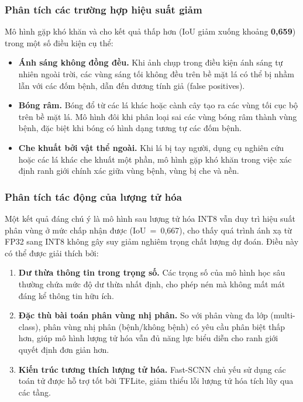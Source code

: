 \documentclass[conference]{IEEEtran}
\begin{document}
\subsubsection{Phân tích các trường hợp hiệu suất giảm}

Mô hình gặp khó khăn và cho kết quả thấp hơn (IoU giảm xuống khoảng \textbf{0,659}) trong một số điều kiện cụ thể:

\begin{itemize}
  \item \textbf{Ánh sáng không đồng đều.} Khi ảnh chụp trong điều kiện ánh sáng tự nhiên ngoài trời, các vùng sáng tối không đều trên bề mặt lá có thể bị nhầm lẫn với các đốm bệnh, dẫn đến dương tính giả (false positives).
  \item \textbf{Bóng râm.} Bóng đổ từ các lá khác hoặc cành cây tạo ra các vùng tối cục bộ trên bề mặt lá. Mô hình đôi khi phân loại sai các vùng bóng râm thành vùng bệnh, đặc biệt khi bóng có hình dạng tương tự các đốm bệnh.
  \item \textbf{Che khuất bởi vật thể ngoài.} Khi lá bị tay người, dụng cụ nghiên cứu hoặc các lá khác che khuất một phần, mô hình gặp khó khăn trong việc xác định ranh giới chính xác giữa vùng bệnh, vùng bị che và nền.
\end{itemize}

\subsubsection{Phân tích tác động của lượng tử hóa}

Một kết quả đáng chú ý là mô hình sau lượng tử hóa INT8 vẫn duy trì hiệu suất phân vùng ở mức chấp nhận được (IoU~=~0,667), cho thấy quá trình ánh xạ từ FP32 sang INT8 không gây suy giảm nghiêm trọng chất lượng dự đoán. Điều này có thể được giải thích bởi:

\begin{enumerate}
  \item \textbf{Dư thừa thông tin trong trọng số.} Các trọng số của mô hình học sâu thường chứa mức độ dư thừa nhất định, cho phép nén mà không mất mát đáng kể thông tin hữu ích.
  \item \textbf{Đặc thù bài toán phân vùng nhị phân.} So với phân vùng đa lớp (multi-class), phân vùng nhị phân (bệnh/không bệnh) có yêu cầu phân biệt thấp hơn, giúp mô hình lượng tử hóa vẫn đủ năng lực biểu diễn cho ranh giới quyết định đơn giản hơn.
  \item \textbf{Kiến trúc tương thích lượng tử hóa.} Fast-SCNN chủ yếu sử dụng các toán tử được hỗ trợ tốt bởi TFLite, giảm thiểu lỗi lượng tử hóa tích lũy qua các tầng.
\end{enumerate}
\end{document}
